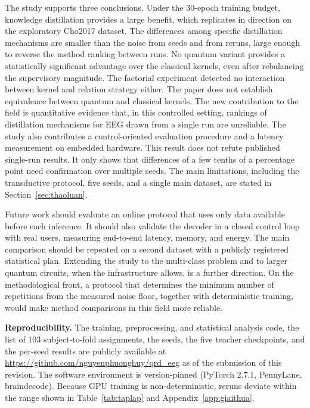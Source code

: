 The study supports three conclusions. Under the 30-epoch training budget,
knowledge distillation provides a large benefit, which replicates in
direction on the exploratory Cho2017 dataset. The differences among
specific distillation mechanisms are smaller than the noise from seeds
and from reruns, large enough to reverse the method ranking between runs.
No quantum variant provides a statistically significant advantage over
the classical kernels, even after rebalancing the supervisory magnitude. The factorial
experiment detected no interaction between kernel and relation strategy
either. The paper does not establish equivalence between quantum and
classical kernels. The new contribution to the field is quantitative
evidence that, in this controlled setting, rankings of distillation
mechanisms for EEG drawn from a single run are unreliable. The study also
contributes a control-oriented evaluation procedure and a latency
measurement on embedded hardware.
This result does not refute published single-run results. It only
shows that differences of a few tenths of a percentage point need
confirmation over multiple seeds. The main limitations, including the
transductive protocol, five seeds, and a single main dataset, are stated
in Section~\ref{sec:thaoluan}.

Future work should evaluate an online protocol that uses only data
available before each inference. It should also validate the decoder in a
closed control loop with real users, measuring end-to-end latency, memory,
and energy. The main comparison should be repeated on a second dataset
with a publicly registered statistical plan. Extending the study to the
multi-class problem and to larger quantum circuits, when the
infrastructure allows, is a further direction. On the methodological front, a protocol that
determines the minimum number of repetitions from the measured noise
floor, together with deterministic training, would make method
comparisons in this field more reliable.

\textbf{Reproducibility.} The training, preprocessing, and statistical
analysis code, the list of 103 subject-to-fold assignments, the seeds,
the five teacher checkpoints, and the per-seed results are publicly available at
\url{https://github.com/nguyenphuonghuy/qrd_eeg} as of the submission of
this revision. The software environment is version-pinned (PyTorch
2.7.1, PennyLane, braindecode). Because GPU training is
non-deterministic, reruns deviate within the range shown in
Table~\ref{tab:taplap} and Appendix~\ref{app:giaithua}.

